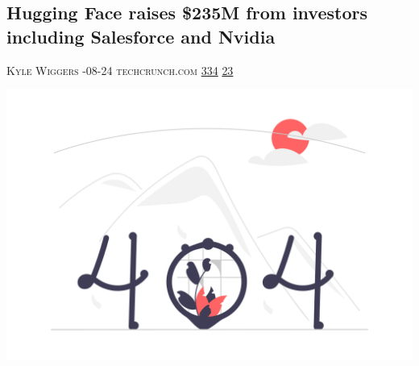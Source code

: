 \documentclass[10pt,a4paper]{article}
\begin{document}
\begin{multicols*}{2}

\noindent\begin{minipage}{\linewidth}
\subsection{Hugging Face raises \$235M from investors including Salesforce and Nvidia}
\textsc{\footnotesize
{\scriptsize\faUser}\space 
Kyle Wiggers 
{\scriptsize\faCalendar}-08-24 
{\scriptsize\faGlobe}\space 
techcrunch.com 
{\scriptsize\faThumbsOUp}\space 
\href{http://news.ycombinator.com/item?id=37248895\&utm\_term=comment}{334} 
{\scriptsize\faComments}\space 
\href{http://news.ycombinator.com/item?id=37248895\&utm\_term=comment}{23} 
}
\par\medskip\noindent
\href{https://techcrunch.com/2023/08/24/hugging-face-raises-235m-from-investors-including-salesforce-and-nvidia/?utm\_source=hackernewsletter\&utm\_medium=email\&utm\_term=startup\_news}{
    \includegraphics[width=0.99\linewidth]{notfound.png}
}
\end{minipage}

\end{multicols*}
\end{document}
